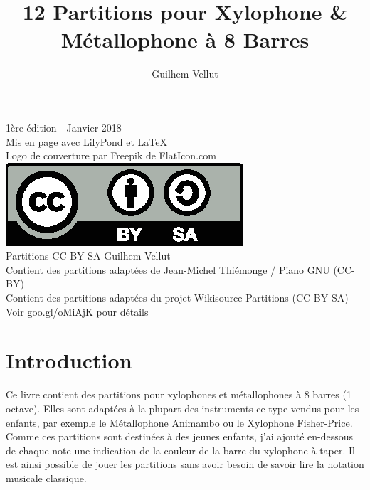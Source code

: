 \documentclass[17pt,letterpaper]{extarticle}
\title{12 Partitions pour Xylophone \& Métallophone à 8 Barres}
\author{Guilhem Vellut}
\date{}
\makeatletter
\def\clearleftpage{\clearpage\ifodd\c@page\else
\hbox{}\newpage\if@twocolumn\hbox{}\newpage\fi\fi}
\makeatother
\begin{document}
\setcounter{secnumdepth}{-1}
\setcounter{page}{1}

\maketitle

\clearpage
\vspace*{\fill}

{\tiny 1ère édition - Janvier 2018 \\ Mis en page avec LilyPond et \LaTeX \\
Logo de couverture par Freepik de FlatIcon.com\\
\newline
\includegraphics{by-sa} \\
\newline
Partitions CC-BY-SA Guilhem Vellut\\
Contient des partitions adaptées de Jean-Michel Thiémonge / Piano GNU (CC-BY)\\
Contient des partitions adaptées du projet Wikisource Partitions (CC-BY-SA)\\
Voir goo.gl/oMiAjK pour détails \par}

\clearpage

\tableofcontents

\clearleftpage

\section{Introduction}

Ce livre contient des partitions pour xylophones et métallophones à 8 barres (1 octave). Elles sont adaptées à la plupart des instruments ce type vendus pour les enfants, par exemple le Métallophone Animambo ou le Xylophone Fisher-Price.\\

Comme ces partitions sont destinées à des jeunes enfants, j'ai ajouté en-dessous de chaque note une indication de la couleur de la barre du xylophone à taper. Il est ainsi possible de jouer les partitions sans avoir besoin de savoir lire la notation musicale classique.\\
\end{document}
